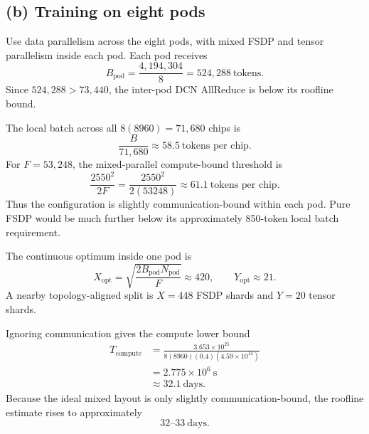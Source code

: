 \documentclass[11pt]{article}
\begin{document}
\subsection*{(b) Training on eight pods}

Use data parallelism across the eight pods, with mixed FSDP and tensor
parallelism inside each pod. Each pod receives
\[
B_{\mathrm{pod}}=\frac{4{,}194{,}304}{8}
=524{,}288\ \text{tokens}.
\]
Since $524{,}288>73{,}440$, the inter-pod DCN AllReduce is below its roofline
bound.

The local batch across all $8(8960)=71{,}680$ chips is
\[
\frac{B}{71{,}680}
\approx58.5\ \text{tokens per chip}.
\]
For $F=53{,}248$, the mixed-parallel compute-bound threshold is
\[
\frac{2550^2}{2F}
=\frac{2550^2}{2(53248)}
\approx61.1\ \text{tokens per chip}.
\]
Thus the configuration is slightly communication-bound within each pod.
Pure FSDP would be much further below its approximately 850-token local
batch requirement.

The continuous optimum inside one pod is
\[
X_{\mathrm{opt}}
=\sqrt{\frac{2B_{\mathrm{pod}}N_{\mathrm{pod}}}{F}}
\approx420,
\qquad
Y_{\mathrm{opt}}\approx21.
\]
A nearby topology-aligned split is $X=448$ FSDP shards and $Y=20$ tensor
shards.

Ignoring communication gives the compute lower bound
\begin{align*}
T_{\mathrm{compute}}
&=\frac{3.653\times10^{25}}
{8(8960)(0.4)(4.59\times10^{14})}\\
&=2.775\times10^6\ \text{s}\\
&\approx32.1\ \text{days}.
\end{align*}
Because the ideal mixed layout is only slightly communication-bound, the
roofline estimate rises to approximately
\[
\boxed{32\text{--}33\ \text{days}}.
\]
\end{document}
